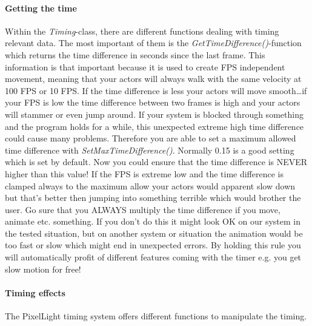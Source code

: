 \paragraph{Getting the time}
Within the \emph{Timing}-class, there are different functions dealing with timing relevant data. The most important of them is the \emph{GetTimeDifference()}-function which returns the time difference in seconds since the last frame. This information is that important because it is used to create FPS independent movement, meaning that your actors will always walk with the same velocity at 100 FPS or 10 FPS. If the time difference is less your actors will move smooth\ldots if your FPS is low the time difference between two frames is high and your actors will stammer or even jump around. If your system is blocked through something and the program holds for a while, this unexpected extreme high time difference could cause many problems. Therefore you are able to set a maximum allowed time difference with \emph{SetMaxTimeDifference()}. Normally 0.15 is a good setting which is set by default. Now you could ensure that the time difference is NEVER higher than this value! If the FPS is extreme low and the time difference is clamped always to the maximum allow your actors would apparent slow down but that's better then jumping into something terrible which would brother the user. Go sure that you ALWAYS multiply the time difference if you move, animate etc. something. If you don't do this it might look OK on our system in the tested situation, but on another system or situation the animation would be too fast or slow which might end in unexpected errors. By holding this rule you will automatically profit of different features coming with the timer e.g. you get slow motion for free!


\paragraph{Timing effects}
The PixelLight timing system offers different functions to manipulate the timing.

